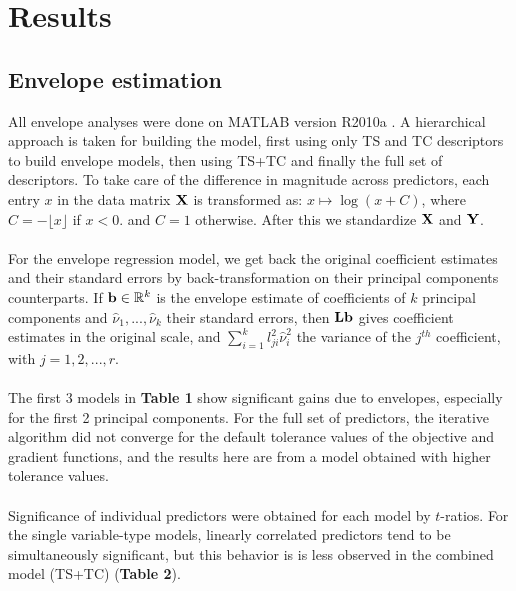 \documentclass[11pt]{llncs}
\begin{document}
\section{Results}
\subsection{Envelope estimation}
All envelope analyses were done on MATLAB version R2010a \cite{matlab}. A hierarchical approach is taken for building the model, first using only TS and TC descriptors to build envelope models, then using TS+TC and finally the full set of descriptors. To take care of the difference in magnitude across predictors, each entry $x$ in the data matrix ${\mathbf{X}}$ is transformed as: $x\mapsto\log(x+C)$, where $C=-\lfloor x\rfloor$ if $x<0$. and $C=1$ otherwise. After this we standardize ${\mathbf{X}}$ and ${\mathbf{Y}}$.

\paragraph{}For the envelope regression model, we get back the original coefficient estimates and their standard errors by back-transformation on their principal components counterparts. If ${\bf{b}}\in{\mathbb{R}}^k$ is the envelope estimate of coefficients of $k$ principal components and $\hat\nu_1,...,\hat\nu_k$ their standard errors, then ${\mathbf{L}}{\bf{b}}$ gives coefficient estimates in the original scale, and $\sum_{i=1}^k l_{ji}^2\hat\nu_i^2$ the variance of the $j^{th}$ coefficient, with $j=1,2,...,r$.

\paragraph{}The first 3 models in \textbf{Table 1} show significant gains due to envelopes, especially for the first 2 principal components. For the full set of predictors, the iterative algorithm did not converge for the default tolerance values of the objective and gradient functions, and the results here are from a model obtained with higher tolerance values.

\paragraph{}Significance of individual predictors were obtained for each model by $t$-ratios. For the single variable-type models, linearly correlated predictors tend to be simultaneously significant, but this behavior is is less observed in the combined model (TS+TC) (\textbf{Table 2}).
\end{document}
